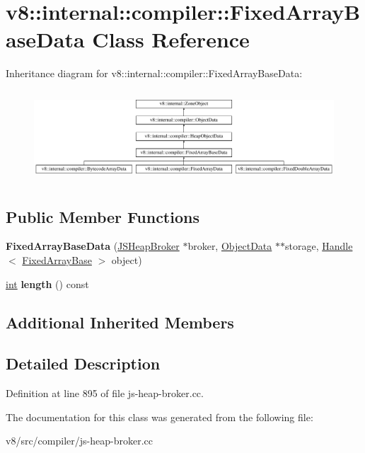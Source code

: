 \hypertarget{classv8_1_1internal_1_1compiler_1_1FixedArrayBaseData}{}\section{v8\+:\+:internal\+:\+:compiler\+:\+:Fixed\+Array\+Base\+Data Class Reference}
\label{classv8_1_1internal_1_1compiler_1_1FixedArrayBaseData}
Inheritance diagram for v8\+:\+:internal\+:\+:compiler\+:\+:Fixed\+Array\+Base\+Data\+:\begin{figure}[H]
\begin{center}
\leavevmode
\includegraphics[height=3.431373cm]{classv8_1_1internal_1_1compiler_1_1FixedArrayBaseData}
\end{center}
\end{figure}
\subsection*{Public Member Functions}
\begin{DoxyCompactItemize}
\item 
\mbox{\label{classv8_1_1internal_1_1compiler_1_1FixedArrayBaseData_aed1c027efc7891d889708093b6f6a887}} 
{\bfseries Fixed\+Array\+Base\+Data} (\mbox{\hyperlink{classv8_1_1internal_1_1compiler_1_1JSHeapBroker}{J\+S\+Heap\+Broker}} $\ast$broker, \mbox{\hyperlink{classv8_1_1internal_1_1compiler_1_1ObjectData}{Object\+Data}} $\ast$$\ast$storage, \mbox{\hyperlink{classv8_1_1internal_1_1Handle}{Handle}}$<$ \mbox{\hyperlink{classv8_1_1internal_1_1FixedArrayBase}{Fixed\+Array\+Base}} $>$ object)
\item 
\mbox{\label{classv8_1_1internal_1_1compiler_1_1FixedArrayBaseData_a954d8b409af375154f437b6754131d51}} 
\mbox{\hyperlink{classint}{int}} {\bfseries length} () const
\end{DoxyCompactItemize}
\subsection*{Additional Inherited Members}


\subsection{Detailed Description}


Definition at line 895 of file js-\/heap-\/broker.\+cc.



The documentation for this class was generated from the following file\+:\begin{DoxyCompactItemize}
\item 
v8/src/compiler/js-\/heap-\/broker.\+cc\end{DoxyCompactItemize}

